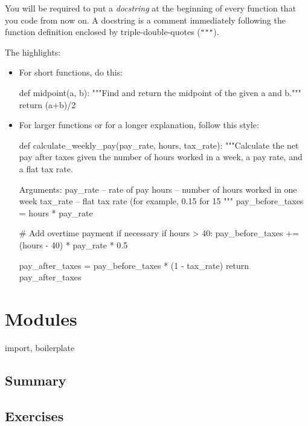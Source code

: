 \documentclass[11pt]{cselabheader}
\begin{document}
You will be required to put a \emph{docstring} at the beginning of every
function that you code from now on. A docstring is a comment immediately
following the function definition enclosed by triple-double-quotes (\texttt{"""}).

The highlights:
\begin{itemize}
  \item For short functions, do this:

    \begin{python3code}
def midpoint(a, b):
    """Find and return the midpoint of the given a and b."""
    return (a+b)/2
    \end{python3code}

  \item For larger functions or for a longer explanation, follow this style:

    \begin{python3code}
def calculate_weekly_pay(pay_rate, hours, tax_rate):
    """Calculate the net pay after taxes given the number of hours worked 
    in a week, a pay rate, and a flat tax rate.

    Arguments:
    pay_rate -- rate of pay
    hours -- number of hours worked in one week
    tax_rate -- flat tax rate (for example, 0.15 for 15%
    """
    pay_before_taxes = hours * pay_rate

    # Add overtime payment if necessary
    if hours > 40:
        pay_before_taxes += (hours - 40) * pay_rate * 0.5

    pay_after_taxes = pay_before_taxes * (1 - tax_rate)
    return pay_after_taxes
    \end{python3code}

\end{itemize}

\pagebreak
\section{Modules}
\label{sec:modules}

import, boilerplate

\subsection{Summary}
\label{subsec:modules.sum}

\subsection{Exercises}
\label{subsec:modules.ex}
\end{document}
